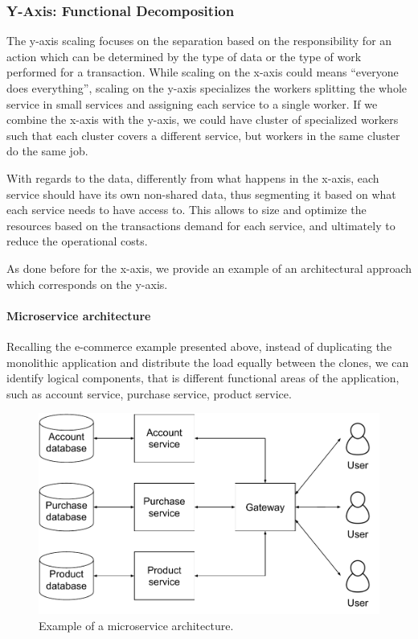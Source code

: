 \subsubsection{Y-Axis: Functional Decomposition}

The y-axis scaling focuses on the separation based on the responsibility for an
action which can be determined by the type of data or the type of work performed
for a transaction. While scaling on the x-axis could means ``everyone does
everything'', scaling on the y-axis specializes the workers splitting the whole
service in small services and assigning each service to a single worker. If we
combine the x-axis with the y-axis, we could have cluster of specialized workers
such that each cluster covers a different service, but workers in the same
cluster do the same job.

With regards to the data, differently from what happens in the x-axis, each
service should have its own non-shared data, thus segmenting it based on what
each service needs to have access to. This allows to size and optimize the
resources based on the transactions demand for each service, and ultimately to
reduce the operational costs.

As done before for the x-axis, we provide an example of an architectural
approach which corresponds on the y-axis.

\paragraph{Microservice architecture}
Recalling the e-commerce example presented above, instead of duplicating the
monolithic application and distribute the load equally between the clones, we
can identify logical components, that is different functional areas of the
application, such as account service, purchase service, product service.

\begin{figure}
	\begin{center}
		\includegraphics[width=.7\textwidth]{./res/img/microservice-architecture.pdf}
	\end{center}
	\caption{Example of a microservice architecture.}
	\label{fig:microservice-architecture}
\end{figure}

